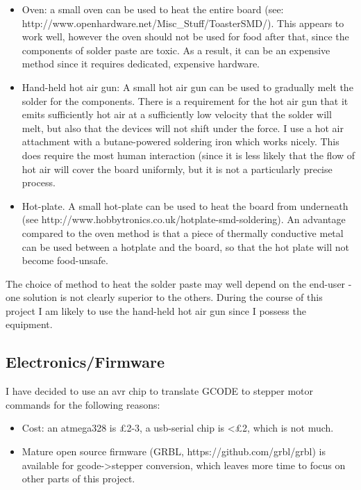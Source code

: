 \documentclass[a4paper,11pt]{article}  %
\begin{document}
\begin{itemize} \itemsep0em
	\item	Oven: a small oven can be used to heat the entire board (see: http://www.openhardware.net/Misc\_Stuff/ToasterSMD/). This appears to
			work well, however the oven should not be used for food after that, since the components of solder paste are toxic. As a result,
			it can be an expensive method since it requires dedicated, expensive hardware.
	\item	Hand-held hot air gun: A small hot air gun can be used to gradually melt the solder for the components. There is a requirement
			for the hot air gun that it emits sufficiently hot air at a sufficiently low velocity that the solder will melt, but also that
			the devices will not shift under the force. I use a hot air attachment with a butane-powered soldering iron which works nicely.
			This does require the most human interaction (since it is less likely that the flow of hot air will cover the board uniformly, but it
			is not a particularly precise process.
	\item	Hot-plate. A small hot-plate can be used to heat the board from underneath (see http://www.hobbytronics.co.uk/hotplate-smd-soldering).
			An advantage compared to the oven method is that a piece of thermally conductive metal can be used between a hotplate and the board, so
			that the hot plate will not become food-unsafe. 
\end{itemize}
			
The choice of method to heat the solder paste may well depend on the end-user - one solution is not clearly superior to the others. During the
course of this project I am likely to use the hand-held hot air gun since I possess the equipment.

\subsection{Electronics/Firmware}
I have decided to use an avr chip to translate GCODE to stepper motor commands for the following reasons:
\begin{itemize} \itemsep0em
	\item	Cost: an atmega328 is £2-3, a usb-serial chip is <£2, which is not much.
	\item	Mature open source firmware (GRBL, https://github.com/grbl/grbl) is available for gcode-\textgreater stepper
		conversion, which leaves more time to focus on other parts of this project.
\end{itemize}
\end{document}
